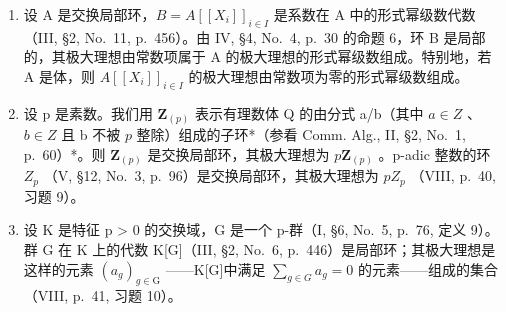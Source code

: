 \begin{enumerate}
\def\labelenumi{\arabic{enumi})}
\setcounter{enumi}{3}
\item
  设 A 是交换局部环，\(B = A[[X_{i}]]_{i \in I}\) 是系数在 A 中的形式幂级数代数（III, §2, No.~11, p.~456）。由 IV, §4, No.~4, p.~30 的命题 6，环 B 是局部的，其极大理想由常数项属于 A 的极大理想的形式幂级数组成。特别地，若 A 是体，则 \(A[[X_{i}]]_{i \in I}\) 的极大理想由常数项为零的形式幂级数组成。
\item
  设 p 是素数。我们用 \(\mathbf{Z}_{(p)}\) 表示有理数体 Q 的由分式 a/b（其中 \(a \in Z\) 、 \(b \in Z\) 且 b 不被 \(p\) 整除）组成的子环*（参看 Comm. Alg., II, §2, No.~1, p.~60）*。则 \(\mathbf{Z}_{(p)}\) 是交换局部环，其极大理想为 \(p\mathbf{Z}_{(p)}\) 。p-adic 整数的环 \(Z_{p}\) （V, §12, No.~3, p.~96）是交换局部环，其极大理想为 \(pZ_{p}\) （VIII, p.~40, 习题 9）。
\item
  设 K 是特征 p \textgreater{} 0 的交换域，G 是一个 p-群（I, §6, No.~5, p.~76, 定义 9）。群 G 在 K 上的代数 K{[}G{]}（III, §2, No.~6, p.~446）是局部环；其极大理想是这样的元素 \((a_{g})_{g \in \mathrm{G}}\) ——K{[}G{]}中满足 \(\sum_{g \in G} a_{g} = 0\) 的元素——组成的集合（VIII, p.~41, 习题 10）。
\end{enumerate}

